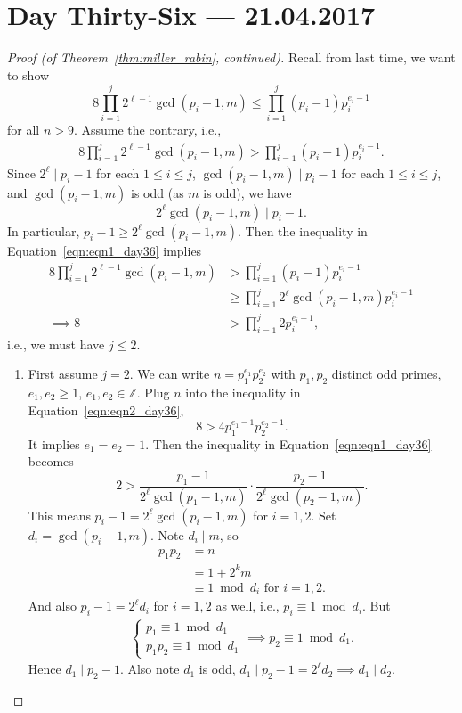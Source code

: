 \documentclass{amsbook}
\theoremstyle{plain}
\theoremstyle{definition}
\theoremstyle{remark}
\numberwithin{equation}{chapter}
\numberwithin{figure}{chapter}
\newcommand{\Z}{\mathbb{Z}}
\begin{document}
\chapter[Lecture Thirty-Six]{Day Thirty-Six \hfill {\footnotesize \rm --- 21.04.2017}}
\begin{proof}[Proof {\rm (of Theorem~\ref{thm:miller_rabin}, continued)}]
Recall from last time, we want to show 
\[%
8 \prod_{i = 1}^j 2^{\ell - 1} \gcd (p_i - 1, m) \leqslant \prod_{i = 1}^j (p_i - 1) p_i^{e_i -1}
\]%
for all $n > 9$. Assume the contrary, i.e., 
\begin{align}
\label{eqn:eqn1_day36} 8 \prod_{i = 1}^j 2^{\ell - 1} \gcd (p_i - 1, m) > \prod_{i = 1}^j (p_i - 1) p_i^{e_i -1}.
\end{align}
Since $2^\ell \mid p_i - 1$ for each $1 \leqslant i \leqslant j$, $\gcd (p_i - 1, m) \mid p_i - 1$ for each $1 \leqslant i \leqslant j$, and $\gcd (p_i - 1, m)$ is odd (as $m$ is odd), we have 
\[
2^\ell \gcd (p_i - 1, m) \mid p_i - 1.
\]
In particular, $p_i - 1 \geqslant 2^\ell \gcd (p_i - 1, m)$. Then the inequality in Equation~\eqref{eqn:eqn1_day36} implies
\begin{align}
8 \prod_{i = 1}^j 2^{\ell - 1} \gcd (p_i - 1, m) &> \prod_{i = 1}^j (p_i - 1) p_i^{e_i -1} \\
                                                 &\geqslant \prod_{i = 1}^j 2^\ell \gcd (p_i - 1, m) p_i^{e_i -1} \\
  \implies 8 &> \prod_{i = 1}^j 2 p_i^{e_i - 1}, \label{eqn:eqn2_day36}
\end{align}
i.e., we must have $j \leqslant 2$.
\begin{enumerate}[label=(\roman*)]
\item First assume $j = 2$. We can write $n = p_1^{e_1}p_2^{e_2}$ with $p_1, p_2$ distinct odd primes, $e_1, e_2 \geqslant 1$, $e_1, e_2 \in \Z$. Plug $n$ into the inequality in Equation~\eqref{eqn:eqn2_day36}, 
\[
  8 > 4 p_1^{e_1 - 1} p_2^{e_2 - 1}.
\]
It implies $e_1 = e_2 = 1$. Then the inequality in Equation~\eqref{eqn:eqn1_day36} becomes
\[
2 > \frac{p_1 - 1}{2^\ell \gcd (p_1 - 1, m)} \cdot \frac{p_2 - 1}{2^\ell \gcd (p_2 - 1, m)}.
\]
This means $p_i - 1 = 2^\ell \gcd (p_i - 1, m)$ for $i = 1, 2$. Set $d_i = \gcd (p_i - 1, m)$. Note 
$d_i \mid m$, so 
\begin{align}
  p_1 p_2 &= n \\
          &= 1 + 2^k m \\
          &\equiv 1 \bmod d_i \text{ for $i = 1, 2$}.
\end{align}
And also $p_i - 1 = 2^\ell d_i$ for $i = 1, 2$ as well, i.e., $p_i \equiv 1 \bmod d_i$. But 
\begin{align}
\left\{ \begin{array}{r}
p_1 \equiv 1 \bmod d_1 \\[1mm]
p_1 p_2 \equiv 1 \bmod d_1 
        \end{array} \right. \implies p_2 \equiv 1 \bmod d_1.
\end{align}
Hence $d_1 \mid p_2 - 1$. Also note $d_1$ is odd, $d_1 \mid p_2 - 1 = 2^\ell d_2 \implies d_1 \mid d_2$. 


\end{enumerate}
\end{proof}
\end{document}
